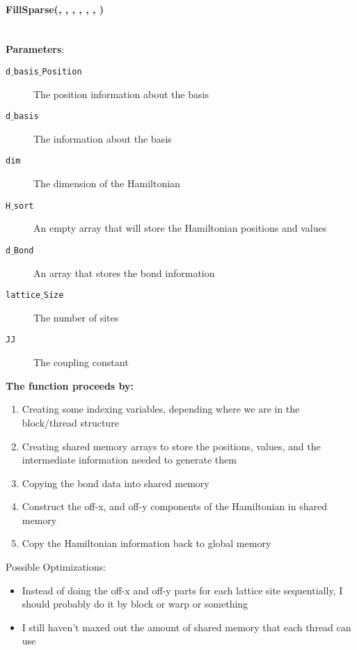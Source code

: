 \documentclass{article}
\begin{document}
\paragraph{\cudaglobal \void FillSparse(\ptrint , \ptrint , \int, \hamstruct, \int , \int , \const \double ) \\ \\ }
\noindent\textbf{Parameters}:
\begin{description}
\item[\ptrint \texttt{d$\_$basis$\_$Position}] The position information about the basis
\item[\ptrint \texttt{d$\_$basis}] The information about the basis
\item[\int \texttt{dim}] The dimension of the Hamiltonian
\item[\hamstruct \texttt{H$\_$sort}] An empty array that will store the Hamiltonian positions and values
\item[\int \texttt{d$\_$Bond}] An array that stores the bond information
\item[\int \texttt{lattice$\_$Size}] The number of sites
\item[\const \double \texttt{JJ}] The coupling constant
\end{description}

\noindent\textbf{The function proceeds by:}
\begin{enumerate}
\item{Creating some indexing variables, depending where we are in the block/thread structure}
\item{Creating shared memory arrays to store the positions, values, and the intermediate information needed to generate them}
\item{Copying the bond data into shared memory}
\item{Construct the off-x, and off-y components of the Hamiltonian in shared memory}
\item{Copy the Hamiltonian information back to global memory}
\end{enumerate}

Possible Optimizations:
\begin{itemize}
\item{Instead of doing the off-x and off-y parts for each lattice site sequentially, I should probably do it by block or warp or something}
\item{I still haven't maxed out the amount of shared memory that each thread can use}
\end{itemize}
\end{document}
